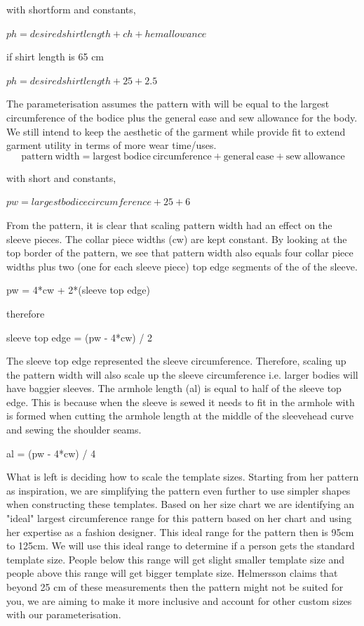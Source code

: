 with shortform and constants,

$ph = desired shirt length + ch + hem allowance$

if shirt length is 65 cm 

$ph = desired shirt length + 25 + 2.5$

The parameterisation assumes the pattern with will be equal to the largest circumference of the bodice plus the general ease and sew allowance for the body. We still intend to keep the aesthetic of the garment while provide fit to extend garment utility in terms of more wear time/uses.
\begin{equation}
    \mathrm{pattern\ width} = \mathrm{largest\ bodice\ circumference} + \mathrm{general\ ease} + \mathrm{sew\ allowance}
    \label{eq:pattern width}
\end{equation}

with short and constants,

$pw = largest bodice circumference + 25 + 6$

From the pattern, it is clear that scaling pattern width had an effect on the sleeve pieces. The collar piece widths (cw) are kept constant. By looking at the top border of the pattern, we see that pattern width also equals four collar piece widths plus two (one for each sleeve piece) top edge segments of the of the sleeve.

pw = 4*cw + 2*(sleeve top edge)

therefore

sleeve top edge = (pw - 4*cw) / 2

The sleeve top edge represented the sleeve circumference. Therefore, scaling up the pattern width will also scale up the sleeve circumference i.e. larger bodies will have baggier sleeves.
The armhole length (al) is equal to half of the sleeve top edge. This is because when the sleeve is sewed it needs to fit in the armhole with is formed when cutting the armhole length at the middle of the sleevehead curve and sewing the shoulder seams.

al = (pw - 4*cw) / 4

What is left is deciding how to scale the template sizes. Starting from her pattern as inspiration, we are simplifying the pattern even further to use simpler shapes when constructing these templates. Based on her size chart we are identifying an "ideal" largest circumference range for this pattern based on her chart and using her expertise as a fashion designer. This ideal range for the pattern then is 95cm to 125cm. We will use this ideal range to determine if a person gets the standard template size. People below this range will get slight smaller template size and people above this range will get bigger template size. Helmersson claims that beyond 25 cm of these measurements then the pattern might not be suited for you, we are aiming to make it more inclusive and account for other custom sizes with our parameterisation. 

